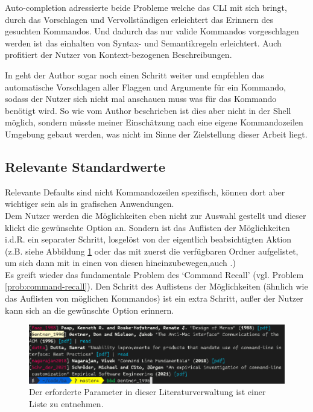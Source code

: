 \documentclass[oneside,bibliography=totocnumbered,BCOR=5mm]{scrbook}
\begin{document}


Auto-completion adressierte beide Probleme welche das CLI mit sich bringt, durch
das Vorschlagen und Vervollständigen erleichtert das Erinnern des gesuchten
Kommandos. Und dadurch das nur valide Kommandos vorgeschlagen werden ist das
einhalten von Syntax- und Semantikregeln erleichtert. Auch profitiert der Nutzer
von Kontext-bezogenen Beschreibungen.

In \cite{dutta} geht der Author sogar noch einen Schritt weiter und empfehlen
das automatische Vorschlagen aller Flaggen und Argumente für ein Kommando,
sodass der Nutzer sich nicht mal anschauen muss was für das Kommando benötigt
wird. So wie vom Author beschrieben ist dies aber nicht in der Shell möglich,
sondern müsste meiner Einschätzung nach eine eigene Kommandozeilen Umgebung
gebaut werden, was nicht im Sinne der Zielstellung dieser Arbeit liegt.

\subsection{Relevante Standardwerte}

Relevante Defaults sind nicht Kommandozeilen spezifisch, können dort aber
wichtiger sein als in grafischen Anwendungen.
\\
Dem Nutzer werden die Möglichkeiten eben nicht zur Auswahl gestellt und dieser
klickt die gewünschte Option an. Sondern ist das Auflisten der Möglichkeiten
i.d.R. ein separater Schritt, losgelöst von der eigentlich beabsichtigten Aktion
(z.B. siehe Abbildung \ref{fig:defaults-demo} oder das mit 
zuerst die verfügbaren Ordner aufgelistet, um sich dann mit  in einen von diesen hineinzubewegen,auch .)
\\
Es greift wieder das fundamentale Problem des `Command Recall' (vgl. Problem
\ref{prob:command-recall}). Den Schritt des Auflistens der Möglichkeiten
(ähnlich wie das Auflisten von möglichen Kommandos) ist ein extra Schritt, außer
der Nutzer kann sich an die gewünschte Option erinnern.

\begin{figure}
  \centering
  \includegraphics[scale=0.5]{defaults-demo.png}
  \caption{Der erforderte Parameter in dieser Literaturverwaltung ist einer Liste zu entnehmen.}
  \label{fig:defaults-demo}
\end{figure}
\end{document}

